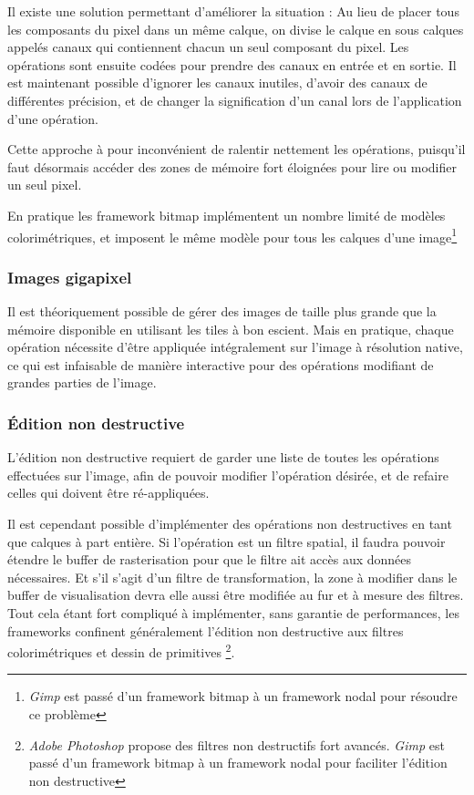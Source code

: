 				Il existe une solution permettant d'améliorer la situation : Au lieu de placer tous les composants du pixel dans un même calque, on
				divise le calque en sous calques appelés canaux qui contiennent chacun un seul composant du pixel. Les opérations sont ensuite 
				codées pour prendre des canaux en entrée et en sortie. Il est maintenant possible d'ignorer les canaux inutiles, d'avoir des canaux
				de différentes précision, et de changer la signification d'un canal lors de l'application d'une opération. 

				Cette approche à pour inconvénient de ralentir nettement les opérations, puisqu'il faut désormais accéder des zones de 
				mémoire fort éloignées pour lire ou modifier un seul pixel. 

				En pratique les framework bitmap implémentent un nombre limité de modèles colorimétriques, et imposent
				le même modèle pour tous les calques d'une image\footnote{\emph{Gimp} est passé d'un framework bitmap à un framework nodal pour
				résoudre ce problème}
			\subsubsection{Images gigapixel}
				Il est théoriquement possible de gérer des images de taille plus grande que la mémoire disponible en utilisant les tiles à
				bon escient. Mais en pratique, chaque opération nécessite d'être appliquée intégralement sur l'image à résolution native, 
				ce qui est infaisable de manière interactive pour des opérations modifiant de grandes parties de l'image.
			\subsubsection{Édition non destructive}
				L'édition non destructive requiert de garder une liste de toutes les opérations effectuées sur l'image, afin de pouvoir
				modifier l'opération désirée, et de refaire celles qui doivent être ré-appliquées. 

				Il est cependant possible d'implémenter des opérations non destructives en tant que calques à part entière. 
				Si l'opération est un filtre spatial, il faudra pouvoir étendre le buffer de rasterisation pour que le filtre ait accès aux données
				nécessaires. Et s'il s'agit d'un filtre de transformation, la zone à modifier dans le buffer de visualisation devra elle aussi
				être modifiée au fur et à mesure des filtres. Tout cela étant fort compliqué à implémenter, sans garantie de performances, 
				les frameworks confinent généralement l'édition non destructive aux filtres colorimétriques et dessin de primitives
				\footnote{\emph{Adobe Photoshop} propose des filtres non destructifs fort avancés. \emph{Gimp} est passé d'un framework
				bitmap à un framework nodal pour faciliter l'édition non destructive}.
